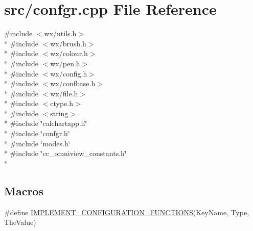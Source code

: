 \hypertarget{a00190}{\section{src/confgr.cpp File Reference}
\label{a00190}
}
{\ttfamily \#include $<$wx/utils.\-h$>$}\\*
{\ttfamily \#include $<$wx/brush.\-h$>$}\\*
{\ttfamily \#include $<$wx/colour.\-h$>$}\\*
{\ttfamily \#include $<$wx/pen.\-h$>$}\\*
{\ttfamily \#include $<$wx/config.\-h$>$}\\*
{\ttfamily \#include $<$wx/confbase.\-h$>$}\\*
{\ttfamily \#include $<$wx/file.\-h$>$}\\*
{\ttfamily \#include $<$ctype.\-h$>$}\\*
{\ttfamily \#include $<$string$>$}\\*
{\ttfamily \#include \char`\"{}calchartapp.\-h\char`\"{}}\\*
{\ttfamily \#include \char`\"{}confgr.\-h\char`\"{}}\\*
{\ttfamily \#include \char`\"{}modes.\-h\char`\"{}}\\*
{\ttfamily \#include \char`\"{}cc\-\_\-omniview\-\_\-constants.\-h\char`\"{}}\\*
\subsection*{Macros}
\begin{DoxyCompactItemize}
\item 
\#define \hyperlink{a00190_a74f08987ba4cf26857a591c7df463703}{I\-M\-P\-L\-E\-M\-E\-N\-T\-\_\-\-C\-O\-N\-F\-I\-G\-U\-R\-A\-T\-I\-O\-N\-\_\-\-F\-U\-N\-C\-T\-I\-O\-N\-S}(Key\-Name, Type, The\-Value)
\end{DoxyCompactItemize}
